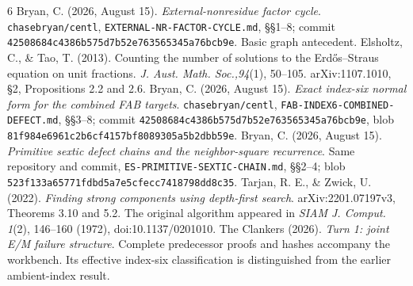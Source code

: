 \documentclass[10pt,a4paper]{article}
\begin{document}
\begingroup\footnotesize
\begin{thebibliography}{6}
 Bryan, C. (2026, August 15). \emph{External-nonresidue factor
cycle}. \texttt{chasebryan/centl}, \texttt{EXTERNAL-NR-FACTOR-CYCLE.md}, \S\S1--8;
commit \texttt{42508684c4386b575d7b52e763565345a76bcb9e}. Basic graph antecedent.
 Elsholtz, C., \& Tao, T. (2013). Counting the number of solutions
to the Erd\H{o}s--Straus equation on unit fractions. \emph{J. Aust. Math. Soc.,94}(1),
50--105. arXiv:1107.1010, \S2, Propositions 2.2 and 2.6.
 Bryan, C. (2026, August 15). \emph{Exact index-six normal form
for the combined FAB targets}. \texttt{chasebryan/centl},
\texttt{FAB-INDEX6-COMBINED-DEFECT.md}, \S\S3--8; commit
\texttt{42508684c4386b575d7b52e763565345a76bcb9e}, blob
\texttt{81f984e6961c2b6cf4157bf8089305a5b2dbb59e}.
 Bryan, C. (2026, August 15). \emph{Primitive sextic defect
chains and the neighbor-square recurrence}. Same repository and commit,
\texttt{ES-PRIMITIVE-SEXTIC-CHAIN.md}, \S\S2--4; blob
\texttt{523f133a65771fdbd5a7e5cfecc7418798dd8c35}.
 Tarjan, R. E., \& Zwick, U. (2022). \emph{Finding strong
components using depth-first search}. arXiv:2201.07197v3, Theorems 3.10 and 5.2.
The original algorithm appeared in \emph{SIAM J. Comput. 1}(2), 146--160 (1972),
doi:10.1137/0201010.
 The Clankers (2026). \emph{Turn 1: joint E/M failure structure}.
Complete predecessor proofs and hashes accompany the workbench. Its effective
index-six classification is distinguished from the earlier ambient-index result.
\end{thebibliography}
\endgroup
\end{document}
